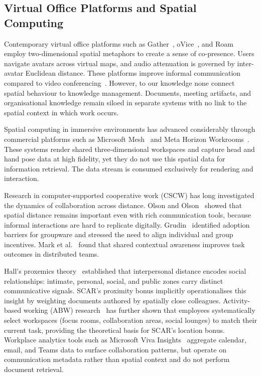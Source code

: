 \documentclass[journal]{IEEEtran}
\begin{document}
\subsection{Virtual Office Platforms and Spatial Computing}

Contemporary virtual office platforms such as Gather~\cite{gather}, oVice~\cite{ovice}, and Roam~\cite{roam} employ two-dimensional spatial metaphors to create a sense of co-presence. Users navigate avatars across virtual maps, and audio attenuation is governed by inter-avatar Euclidean distance. These platforms improve informal communication compared to video conferencing~\cite{olson2000distance}. However, to our knowledge none connect spatial behaviour to knowledge management. Documents, meeting artifacts, and organisational knowledge remain siloed in separate systems with no link to the spatial context in which work occurs.

Spatial computing in immersive environments has advanced considerably through commercial platforms such as Microsoft Mesh~\cite{microsoft_mesh} and Meta Horizon Workrooms~\cite{meta_horizon}. These systems render shared three-dimensional workspaces and capture head and hand pose data at high fidelity, yet they do not use this spatial data for information retrieval. The data stream is consumed exclusively for rendering and interaction.

Research in computer-supported cooperative work (CSCW) has long investigated the dynamics of collaboration across distance. Olson and Olson~\cite{olson2000distance} showed that spatial distance remains important even with rich communication tools, because informal interactions are hard to replicate digitally. Grudin~\cite{grudin1994groupware} identified adoption barriers for groupware and stressed the need to align individual and group incentives. Mark et al.~\cite{mark2008cost} found that shared contextual awareness improves task outcomes in distributed teams.

Hall's proxemics theory~\cite{hall1966hidden} established that interpersonal distance encodes social relationships: intimate, personal, social, and public zones carry distinct communicative signals. SCAR's proximity bonus implicitly operationalises this insight by weighting documents authored by spatially close colleagues. Activity-based working (ABW) research~\cite{appel2020abw} has further shown that employees systematically select workspaces (focus rooms, collaboration areas, social lounges) to match their current task, providing the theoretical basis for SCAR's location bonus. Workplace analytics tools such as Microsoft Viva Insights~\cite{viva_insights} aggregate calendar, email, and Teams data to surface collaboration patterns, but operate on communication metadata rather than spatial context and do not perform document retrieval.
\end{document}

